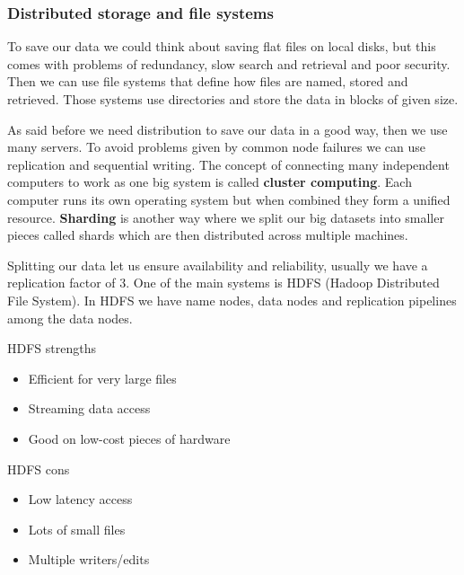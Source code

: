 \subsubsection{Distributed storage and file systems}

To save our data we could think about saving flat files on local disks, but this comes with problems of redundancy, slow search and retrieval and poor security. Then we can use file systems that define how files are named, stored and retrieved. Those systems use directories and store the data in blocks of given size. 

\vspace{10pt}

As said before we need distribution to save our data in a good way, then we use many servers. To avoid problems given by common node failures we can use replication and sequential writing. The concept of connecting many independent computers to work as one big system is called \textbf{cluster computing}. Each computer runs its own operating system but when combined they form a unified resource. \textbf{Sharding} is another way where we split our big datasets into smaller pieces called shards which are then distributed across multiple machines. 

\vspace{10pt}

Splitting our data let us ensure availability and reliability, usually we have a replication factor of 3. One of the main systems is HDFS (Hadoop Distributed File System). In HDFS we have name nodes, data nodes and replication pipelines among the data nodes. 

\vspace{10pt}

HDFS strengths

\begin{itemize}
    \item Efficient for very large files
    \item Streaming data access
    \item Good on low-cost pieces of hardware
\end{itemize}

HDFS cons
\begin{itemize}
    \item Low latency access
    \item Lots of small files
    \item Multiple writers/edits
\end{itemize}

